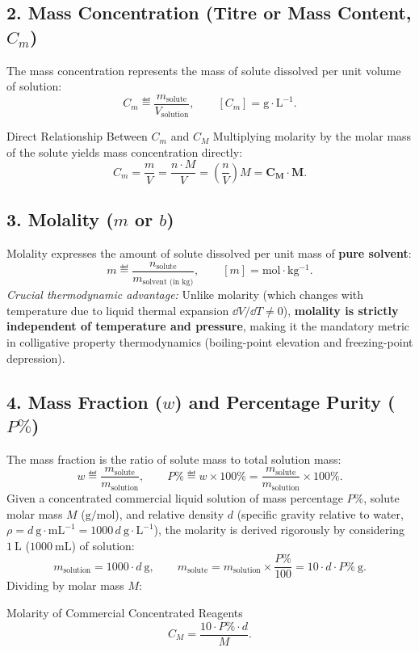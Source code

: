 \subsection{2. Mass Concentration (Titre or Mass Content, $C_m$)}
The mass concentration represents the mass of solute dissolved per unit volume of solution:
\begin{equation}
C_m \eqdef \frac{m_{\text{solute}}}{V_{\text{solution}}}, \qquad [C_m] = \mathrm{g\cdot L^{-1}}.
\end{equation}

\begin{lawbox}{Direct Relationship Between $C_m$ and $C_M$}
Multiplying molarity by the molar mass of the solute yields mass concentration directly:
\begin{equation}
C_m = \frac{m}{V} = \frac{n \cdot M}{V} = \left(\frac{n}{V}\right) M = \mathbf{C_M \cdot M}.
\end{equation}
\end{lawbox}

\subsection{3. Molality ($m$ or $b$)}
Molality expresses the amount of solute dissolved per unit mass of \textbf{pure solvent}:
\begin{equation}
m \eqdef \frac{n_{\text{solute}}}{m_{\text{solvent (in kg)}}}, \qquad [m] = \mathrm{mol\cdot kg^{-1}}.
\end{equation}
\emph{Crucial thermodynamic advantage:} Unlike molarity (which changes with temperature due to liquid thermal expansion $\dd V/\dd T \neq 0$), \textbf{molality is strictly independent of temperature and pressure}, making it the mandatory metric in colligative property thermodynamics (boiling-point elevation and freezing-point depression).

\subsection{4. Mass Fraction ($w$) and Percentage Purity ($P\%$)}
The mass fraction is the ratio of solute mass to total solution mass:
\begin{equation}
w \eqdef \frac{m_{\text{solute}}}{m_{\text{solution}}}, \qquad P\% \eqdef w \times 100\% = \frac{m_{\text{solute}}}{m_{\text{solution}}} \times 100\%.
\end{equation}
Given a concentrated commercial liquid solution of mass percentage $P\%$, solute molar mass $M$ ($\mathrm{g/mol}$), and relative density $d$ (specific gravity relative to water, $\rho = d\ \mathrm{g\cdot mL^{-1}} = 1000\,d\ \mathrm{g\cdot L^{-1}}$), the molarity is derived rigorously by considering $1\ \mathrm{L}$ ($1000\ \mathrm{mL}$) of solution:
\[
m_{\text{solution}} = 1000 \cdot d\ \mathrm{g}, \qquad m_{\text{solute}} = m_{\text{solution}} \times \frac{P\%}{100} = 10 \cdot d \cdot P\%\ \mathrm{g}.
\]
Dividing by molar mass $M$:
\begin{lawbox}{Molarity of Commercial Concentrated Reagents}
\begin{equation}
C_M = \frac{10 \cdot P\% \cdot d}{M}.
\end{equation}
\end{lawbox}

